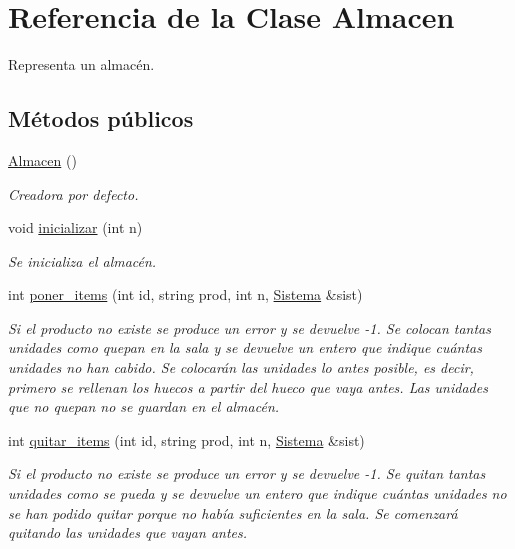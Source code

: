 \hypertarget{class_almacen}{}\section{Referencia de la Clase Almacen}
\label{class_almacen}


Representa un almacén.  


\subsection*{Métodos públicos}
\begin{DoxyCompactItemize}
\item 
\hyperlink{class_almacen_a68a6084d5775d391c52d4825072a0612}{Almacen} ()
\begin{DoxyCompactList}\small\item\em Creadora por defecto. \end{DoxyCompactList}\item 
void \hyperlink{class_almacen_ae953db6cd573ea3f54e6a02245a25175}{inicializar} (int n)
\begin{DoxyCompactList}\small\item\em Se inicializa el almacén. \end{DoxyCompactList}\item 
int \hyperlink{class_almacen_a0285105782dc12b843cbdad492887956}{poner\+\_\+items} (int id, string prod, int n, \hyperlink{class_sistema}{Sistema} \&sist)
\begin{DoxyCompactList}\small\item\em Si el producto no existe se produce un error y se devuelve -\/1. Se colocan tantas unidades como quepan en la sala y se devuelve un entero que indique cuántas unidades no han cabido. Se colocarán las unidades lo antes posible, es decir, primero se rellenan los huecos a partir del hueco que vaya antes. Las unidades que no quepan no se guardan en el almacén. \end{DoxyCompactList}\item 
int \hyperlink{class_almacen_a2ed6c0f1a88f8ba8d2ad2268640a890f}{quitar\+\_\+items} (int id, string prod, int n, \hyperlink{class_sistema}{Sistema} \&sist)
\begin{DoxyCompactList}\small\item\em Si el producto no existe se produce un error y se devuelve -\/1. Se quitan tantas unidades como se pueda y se devuelve un entero que indique cuántas unidades no se han podido quitar porque no había suficientes en la sala. Se comenzará quitando las unidades que vayan antes. \end{DoxyCompactList}\item 

\end{DoxyCompactItemize}
